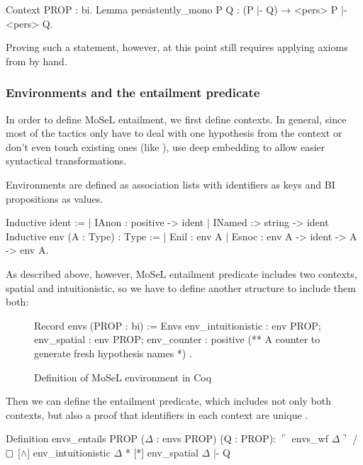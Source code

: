 \begin{minipage}{\linewidth}
\begin{coq}
Context {PROP : bi}.
Lemma persistently_mono P Q : (P |- Q) → <pers> P |- <pers> Q.
\end{coq}
\end{minipage}

Proving such a statement, however, at this point still requires applying axioms from  by hand.

\subsubsection{Environments and the entailment predicate}
\label{subsubsec:environment-entailment-pred}

In order to define MoSeL entailment, we first define contexts.
In general, since most of the tactics only have to deal with one hypothesis from the context or don't even touch existing ones (like ), \citet{krebbersMoSeLGeneralExtensible2018} use deep embedding to allow easier syntactical transformations.

Environments are defined as association lists with identifiers as keys and BI propositions as values.

\begin{coq}
Inductive ident :=
  | IAnon : positive -> ident
  | INamed :> string -> ident
Inductive env (A : Type) : Type :=
  | Enil : env A
  | Esnoc : env A -> ident -> A -> env A.
\end{coq}

As described above, however, MoSeL entailment predicate includes two contexts, spatial and intuitionistic, so we have to define another structure to include them both:

\begin{figure}[H]
\centering
\begin{coq}
Record envs (PROP : bi) := Envs {
  env_intuitionistic : env PROP;
  env_spatial : env PROP;
  env_counter : positive (** A counter to generate fresh hypothesis names *)
}.
\end{coq}
\caption{Definition of MoSeL environment in Coq}
\label{fig:coq_envs}
\end{figure}


Then we can define the entailment predicate, which includes not only both contexts, but also a proof that identifiers in each context are unique .
\begin{coq}
  Definition envs_entails {PROP} ($\Delta$ : envs PROP) (Q : PROP):
  $\ulcorner$ envs_wf $\Delta \urcorner$ /\ $\mathop{\Box}$ [$\wedge$] env_intuitionistic $\Delta$ * [*] env_spatial $\Delta$ |- Q
\end{coq}

